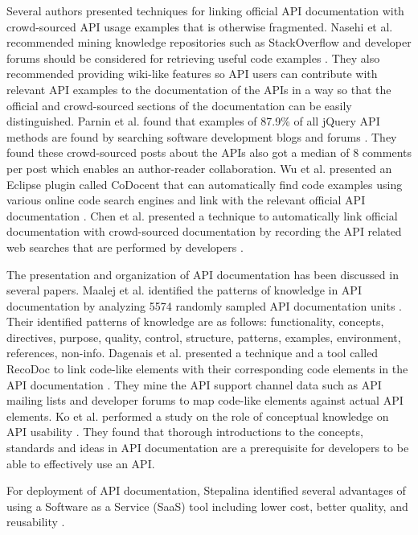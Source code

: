 \documentclass[11pt,oneside]{book}
\begin{document}
Several authors presented techniques for linking official API documentation with crowd-sourced API usage examples that is otherwise fragmented. Nasehi et al. recommended mining knowledge repositories such as StackOverflow and developer forums should be considered for retrieving useful code examples \cite{Nasehi_what_makes}. They also recommended providing wiki-like features so API users can contribute with relevant API examples to the documentation of the APIs in a way so that the official and crowd-sourced sections of the documentation can be easily distinguished. Parnin et al. found that examples of 87.9\% of all jQuery API methods are found by searching software development blogs and forums \cite{Parnin_measuring}. They found these crowd-sourced posts about the APIs also got a median of 8 comments per post which enables an author-reader collaboration. Wu et al. presented an Eclipse plugin called CoDocent that can automatically find code examples using various online code search engines and link with the relevant official API documentation \cite{wu2010codocent}. Chen et al. presented a technique to automatically link official documentation with crowd-sourced documentation by recording the API related web searches that are performed by developers \cite{Chen_who_asked}.

The presentation and organization of API documentation has been discussed in several papers. Maalej et al. identified the patterns of knowledge in API documentation by analyzing 5574 randomly sampled API documentation units \cite{maalej2013patterns}. Their identified patterns of knowledge are as follows: functionality, concepts, directives, purpose, quality, control, structure, patterns, examples, environment, references, non-info. Dagenais et al. presented a technique and a tool called RecoDoc to link code-like elements with their corresponding code elements in the API documentation \cite{dagenais2012recovering}. They mine the API support channel data such as API mailing lists and developer forums to map code-like elements against actual API elements. Ko et al. performed a study on the role of conceptual knowledge on API usability \cite{ko2011role}. They found that thorough introductions to the concepts, standards and ideas in API documentation are a prerequisite for developers to be able to effectively use an API.

For deployment of API documentation, Stepalina identified several advantages of using a Software as a Service (SaaS) tool including lower cost, better quality, and reusability \cite{Stepalina_saas}.
\end{document}
